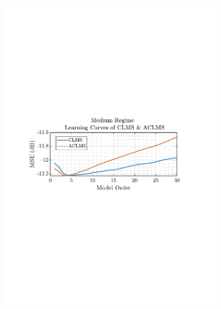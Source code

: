 \documentclass[12pt]{article}
\numberwithin{equation}{section}
\begin{document}
\begin{figure}[H]
\begin{subfigure}{0.49\textwidth}
					\includegraphics[trim={2.2cm 11.2cm 3.15cm  11.2cm}, clip, width=\textwidth]{../MATLAB/figures/q3_1b_fig06.pdf} 
				\end{subfigure}
				\begin{subfigure}{0.49\textwidth}
					\centering

\end{subfigure}
\end{figure}
\end{document}
